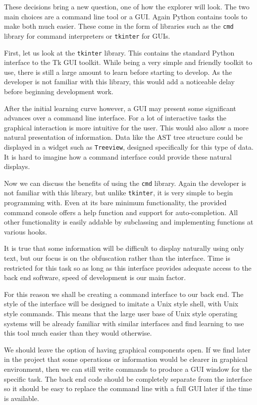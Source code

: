 \documentclass[twoside,a4paper]{report}
\begin{document}
These decisions bring a new question, one of how the explorer will look. The two main choices are a command line tool or a GUI. Again
Python contains tools to make both much easier. These come in the form of libraries such as the \texttt{cmd} library \cite{pycmd} for command
interpreters or \texttt{tkinter} \cite{pytkinter} for GUIs.

First, let us look at the \texttt{tkinter} library. This contains the standard Python interface to the Tk GUI toolkit. While being
a very simple and friendly toolkit to use, there is still a large amount to learn before starting to develop. As the developer is
not familiar with this library, this would add a noticeable delay before beginning development work.

After the initial learning curve however, a GUI may present some significant advances over a command line interface. For a lot of interactive
tasks the graphical interaction is more intuitive for the user. This would also allow a more natural presentation of information. Data like
the AST tree structure could be displayed in a widget such as \texttt{Treeview}, designed specifically for this type of data. It is hard to
imagine how a command interface could provide these natural displays.

Now we can discuss the benefits of using the \texttt{cmd} library. Again the developer is not familiar with this library, but unlike
\texttt{tkinter}, it is very simple to begin programming with. Even at its bare minimum functionality, the provided command console offers a help
function and support for auto-completion. All other functionality is easily addable by subclassing and implementing functions at various
hooks.

It is true that some information will be difficult to display naturally using only text, but our focus is on the obfuscation rather than
the interface. Time is restricted for this task so as long as this interface provides adequate access to the back end software, speed
of development is our main factor.

For this reason we shall be creating a command interface to our back end. The style of the interface will be designed to imitate a
Unix style shell, with Unix style commands. This means that the large user base of Unix style operating systems will be already familiar
with similar interfaces and find learning to use this tool much easier than they would otherwise.

We should leave the option of having graphical components open. If we find later in the project that some operations or information would
be clearer in graphical environment, then we can still write commands to produce a GUI window for the specific task. The back end code should be completely
separate from the interface so it should be easy to replace the command line with a full GUI later if the time is available.
\end{document}
